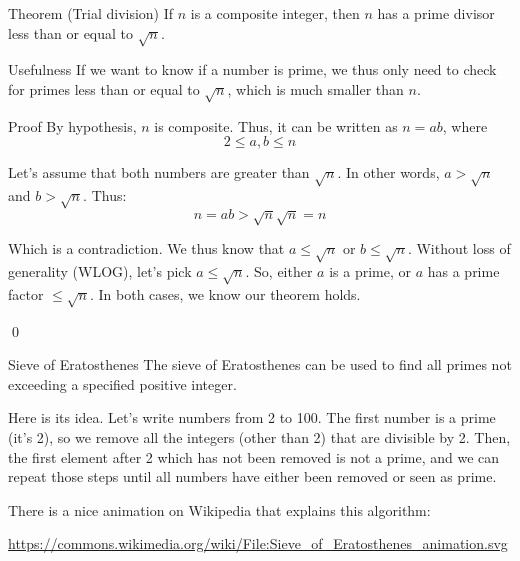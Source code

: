 \documentclass[a4paper]{article}
\begin{document}
\begin{parag}{Theorem (Trial division)}
    If $n$ is a composite integer, then $n$ has a prime divisor less than or equal to $\sqrt{n}$.

    \begin{subparag}{Usefulness}
        If we want to know if a number is prime, we thus only need to check for primes less than or equal to $\sqrt{n}$, which is much smaller than $n$.
    \end{subparag}

    \begin{subparag}{Proof}
        By hypothesis, $n$ is composite. Thus, it can be written as $n = ab$, where 
        \[2 \leq a,b \leq n\]

        Let's assume that both numbers are greater than $\sqrt{n}$. In other words, $a > \sqrt{n}$ and $b > \sqrt{n}$. Thus: 
        \[n = ab > \sqrt{n}\sqrt{n} = n\]
        
        Which is a contradiction. We thus know that $a \leq \sqrt{n}$ or $b \leq \sqrt{n}$. Without loss of generality (WLOG), let's pick $a \leq \sqrt{n}$. So, either $a$ is a prime, or $a$ has a prime factor $\leq \sqrt{n}$. In both cases, we know our theorem holds.

        \qed
    \end{subparag}
\end{parag}

\begin{parag}{Sieve of Eratosthenes}
    The sieve of Eratosthenes can be used to find all primes not exceeding a specified positive integer. 

    Here is its idea. Let's write numbers from 2 to 100. The first number is a prime (it's 2), so we remove all the integers (other than 2) that are divisible by 2. Then, the first element after 2 which has not been removed is not a prime, and we can repeat those steps until all numbers have either been removed or seen as prime. 

    There is a nice animation on Wikipedia that explains this algorithm:

    \begin{center}
        \small\url{https://commons.wikimedia.org/wiki/File:Sieve_of_Eratosthenes_animation.svg}
    \end{center}
\end{parag}
\end{document}
